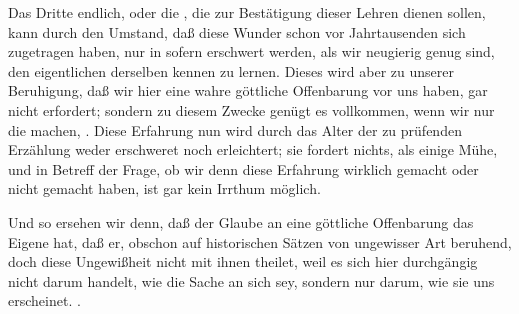\begin{aufza}
\item  Das Dritte endlich, oder die , die zur Bestätigung dieser Lehren dienen sollen, kann durch den Umstand, daß diese Wunder schon vor Jahrtausenden sich zugetragen haben, nur in sofern erschwert werden, als wir neugierig genug sind, den eigentlichen  derselben kennen zu lernen. Dieses wird aber zu unserer Beruhigung, daß wir hier eine wahre göttliche Offenbarung vor uns haben, gar nicht erfordert; sondern zu diesem Zwecke genügt es vollkommen, wenn wir nur die  machen, . Diese Erfahrung nun wird durch das Alter der zu prüfenden Erzählung weder erschweret noch erleichtert; sie fordert nichts, als einige Mühe, und in Betreff der Frage, ob wir denn diese Erfahrung wirklich gemacht oder nicht gemacht haben, ist gar kein Irrthum möglich.
\item  Und so ersehen wir denn, daß der Glaube an eine göttliche Offenbarung das Eigene hat, daß er, obschon auf historischen Sätzen von ungewisser Art beruhend, doch diese Ungewißheit nicht mit ihnen theilet, weil es sich hier durchgängig nicht darum handelt, wie die Sache an sich sey, sondern nur darum, wie sie uns erscheinet. .~
\end{aufza}

